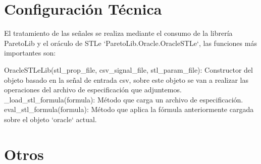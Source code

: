  
\section{Configuración Técnica}
El tratamiento de las señales se realiza mediante el consumo de la librería ParetoLib y el oráculo de STLe `ParetoLib.Oracle.OracleSTLe`, las funciones más importantes son: 
 
OracleSTLeLib(stl\_prop\_file, csv\_signal\_file, stl\_param\_file): Constructor del objeto basado en la señal de entrada csv, sobre este objeto se van a realizar las operaciones del archivo de especificación que adjuntemos. 
\_load\_stl\_formula(formula): Método que carga un archivo de especificación. 
eval\_stl\_formula(formula): Método que aplica la fórmula anteriormente cargada sobre el objeto `oracle` actual.
 
 
 
 
 
\section{Otros}